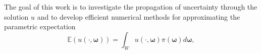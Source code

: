 The goal of this work is to investigate the propagation of uncertainty through the solution $u$ and to develop efficient numerical methods for approximating the parametric expectation 
%
 \begin{equation}
 \label{eq:QoI}
      \mathbb{E}\left(u(\cdot,\boldsymbol \omega)\right)=\int_W u(\cdot,\boldsymbol{\omega})\pi(\boldsymbol\omega)d\boldsymbol{\omega},
 \end{equation}
%


